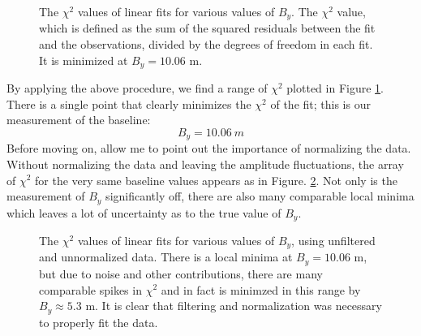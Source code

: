 \documentclass[12pt]{article}
\begin{document}
\begin{figure}[H]
\caption[SODUMB]{The $\chi^2$ values of linear fits for various values of $B_y$. The $\chi^2$ value, which is defined as the sum of the squared residuals between the fit and the observations, divided by the degrees of freedom in each fit. It is minimized at $B_y=10.06$ m.}
\label{fig:baseline-chi2}
\end{figure}

By applying the above procedure, we find a range of $\chi^2$ plotted in Figure \ref{fig:baseline-chi2}. There is a single point that clearly minimizes the $\chi^2$ of the fit; this is our measurement of the baseline:
\begin{equation}
B_y = 10.06\ m 
\end{equation}
Before moving on, allow me to point out the importance of normalizing the data. Without normalizing the data and leaving the amplitude fluctuations, the array of $\chi^2$ for the very same baseline values appears as in Figure. \ref{fig:bad-chi2}. Not only is the measurement of $B_y$ significantly off, there are also many comparable local minima which leaves a lot of uncertainty as to the true value of $B_y$.

\begin{figure}[H]
\caption[SODUMB]{The $\chi^2$ values of linear fits for various values of $B_y$, using unfiltered and unnormalized data. There is a local minima at $B_y=10.06$ m, but due to noise and other contributions, there are many comparable spikes in $\chi^2$ and in fact is minimzed in this range by $B_y \approx 5.3$ m. It is clear that filtering and normalization was necessary to properly fit the data.}
\label{fig:bad-chi2}
\end{figure}
\end{document}
